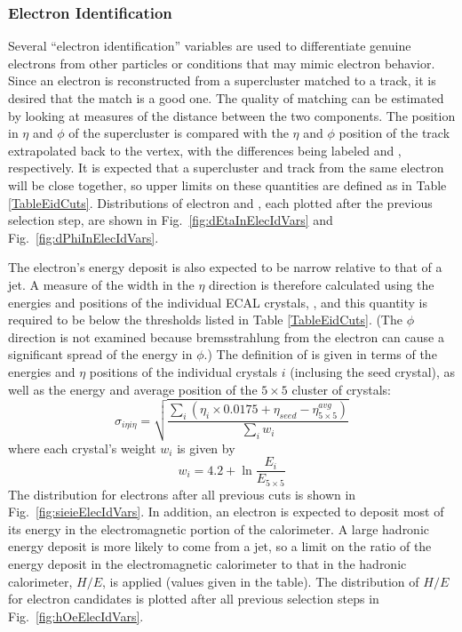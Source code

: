 \subsubsection{Electron Identification}
\label{evSel:eid}
Several ``electron identification'' variables are used to differentiate genuine electrons  %
from other particles or conditions that may mimic electron behavior.  
Since an electron is reconstructed from a supercluster matched to a track, it is desired that the match is a good one.
The quality of matching can be estimated by looking at measures of the distance between the two components.
The position in $ \eta $ and $ \phi $ of the supercluster is compared with 
the $ \eta $ and $ \phi $ position of the track extrapolated back to the vertex, 
with the differences being labeled \detain and \dphiin, respectively.  
It is expected that a supercluster and track from the same electron will be close together, 
so upper limits on these quantities are defined as in Table \ref{TableEidCuts}.  
Distributions of electron \detain and \dphiin, 
each plotted after the previous selection step,%
are shown in Fig.~\ref{fig:dEtaInElecIdVars} and 
Fig.~\ref{fig:dPhiInElecIdVars}.  

The electron's energy deposit is also expected to be narrow relative to that of a jet.
A measure of the width in the $ \eta $ direction is therefore calculated 
using the energies and positions of the individual ECAL crystals, \sieie,
and this quantity is required to be below the thresholds listed in Table \ref{TableEidCuts}.  
(The $ \phi $ direction is not examined because bremsstrahlung from the electron 
can cause a significant spread of the energy in $ \phi $.)  
The definition of \sieie is given in terms of the energies and $\eta$ positions of the  %
individual crystals $i$ (inclusing the seed crystal), 
as well as the energy and average position of the 
$5 \times 5$ cluster of crystals: 
\[
\sigma_{i \eta i \eta} = \sqrt{ \frac{ \sum_i{(\eta_i \times 0.0175 + \eta_{seed} - \eta_{5 \times 5}^{avg})}}{\sum_i{w_i}} }
\]
where each crystal's weight $w_i$ is given by 
\[
w_i = 4.2 + \ln{ \frac{E_i}{E_{5 \times 5}} }
\]
The \sieie distribution for electrons after all previous cuts is shown in 
Fig.~\ref{fig:sieieElecIdVars}.  
In addition, an electron is expected to deposit most of its energy in the 
electromagnetic portion of the calorimeter.  
A large hadronic energy deposit is more likely to come from a jet, 
so a limit on the ratio of the energy deposit in the electromagnetic calorimeter 
to that in the hadronic calorimeter, $ H/E $, is applied (values given in the table).  
The distribution of $H/E$ for electron candidates is plotted after 
all previous selection steps in Fig.~\ref{fig:hOeElecIdVars}.  


